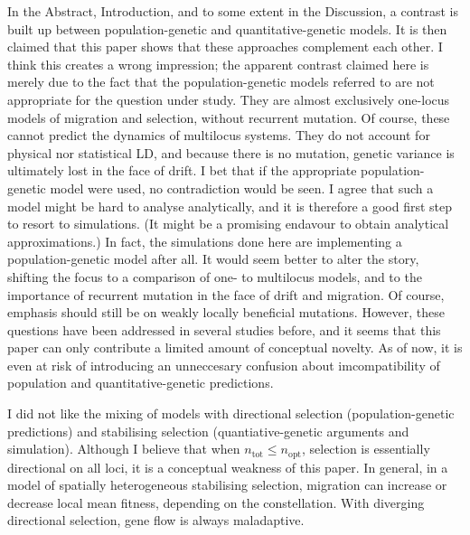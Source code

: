 \documentclass[11pt]{article}
\newenvironment{my_enumerate}
{\begin{enumerate}
  \setlength{\itemsep}{2pt}
  \setlength{\parskip}{0pt}
  \setlength{\parsep}{0pt}}
{\end{enumerate}}
\begin{document}
\begin{my_enumerate}
	\item In the Abstract, Introduction, and to some extent in the Discussion, a contrast is built up between population-genetic and quantitative-genetic models. It is then claimed that this paper shows that these approaches complement each other. I think this creates a wrong impression; the apparent contrast claimed here is merely due to the fact that the population-genetic models referred to are not appropriate for the question under study. They are almost exclusively one-locus models of migration and selection, without recurrent mutation. Of course, these cannot predict the dynamics of multilocus systems. They do not account for physical nor statistical LD, and because there is no mutation, genetic variance is ultimately lost in the face of drift. I bet that if the appropriate population-genetic model were used, no contradiction would be seen. I agree that such a model might be hard to analyse analytically, and it is therefore a good first step to resort to simulations. (It might be a promising endavour to obtain analytical approximations.) In fact, the simulations done here are implementing a population-genetic model after all. It would seem better to alter the story, shifting the focus to a comparison of one- to multilocus models, and to the importance of recurrent mutation in the face of drift and migration. Of course, emphasis should still be on weakly locally beneficial mutations. However, these questions have been addressed in several studies before, and it seems that this paper can only contribute a limited amount of conceptual novelty. As of now, it is even at risk of introducing an unneccesary confusion about imcompatibility of population and quantitative-genetic predictions.
	\item I did not like the mixing of models with directional selection (population-genetic predictions) and stabilising selection (quantiative-genetic arguments and simulation). Although I believe that when $n_\mathrm{tot} \le n_\mathrm{opt}$, selection is essentially directional on all loci, it is a conceptual weakness of this paper. In general, in a model of spatially heterogeneous stabilising selection, migration can increase or decrease local mean fitness, depending on the constellation. With diverging directional selection, gene flow is always maladaptive.

\end{my_enumerate}
\end{document}
